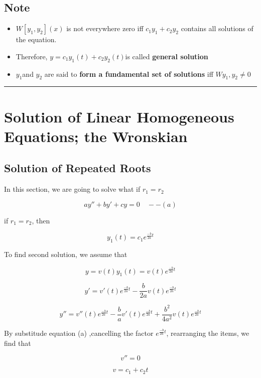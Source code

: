 \documentclass[12pt, a4paper]{article}
\theoremstyle{break}
\providecommand{\tightlist}{\setlength{\itemsep}{0pt}\setlength{\parskip}{0pt}}
\begin{document}
\subsection{Note}\label{note}

\begin{itemize}
\tightlist
\item
  \(W[y_1,y_2](x)\) is not everywhere zero iff \(c_1 y_1 + c_2 y_2\) contains all solutions of the equation.
\item
  Therefore, \(y = c_1 y_1(t) + c_2 y_2(t)\)is called \textbf{general solution }
\item
  \(y_1\)and \(y_2\) are said to \textbf{form a fundamental set of solutions }iff \(Wy_1 ,y_2 \neq 0\)
\end{itemize}

\begin{center}\rule{0.5\linewidth}{0.5pt}\end{center}

\section{Solution of Linear Homogeneous Equations; the Wronskian}\label{solution-of-linear-homogeneous-equations-the-wronskian-1}

\subsection{Solution of Repeated Roots}\label{solution-of-repeated-roots}

In this section, we are going to solve what if \(r_1 = r_2\)

\[
ay'' + by' +cy = 0 \quad --(a)
\]

if \(r_1 = r_2\), then

\[
y_1(t) = c_1 e^{\frac{-b}{2a}t}
\]

To find second solution, we assume that

\[
y = v(t)y_1(t) = v(t)e^{\frac{-b}{2a}t}
\]

\[
y' = v'(t)e^{\frac{-b}{2a}t} - \frac{b}{2a}v(t)e^{\frac{-b}{2a}t}
\]

\[
y'' = v''(t)e^{\frac{-b}{2a}t} - \frac{b}{a}v'(t)e^{\frac{-b}{2a}t} + \frac{b^2}{4a^2}v(t)e^{\frac{-b}{2a}t}
\]

By substitude equation (a) ,cancelling the factor \(e^{\frac{-b}{2a}t}\), rearranging the items, we find that

\[
v'' = 0
\]

\[
v = c_1 + c_2 t
\]
\end{document}
